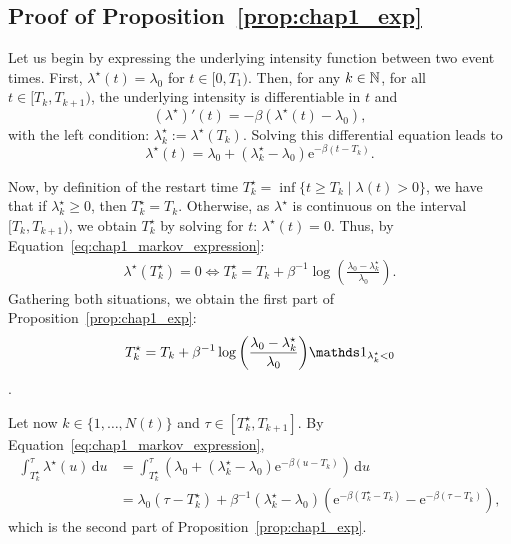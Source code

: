 \begin{subappendices}
\section{Proof of Proposition~\ref{prop:chap1_exp}}
\label{app:chap1_appendix}

Let us begin by expressing the underlying intensity function between two event times.
First, \(\lambda^\star(t) = \lambda_0\) for \(t\in[0,T_1)\).
Then, for any $k\in{\mathbb N}$, for all $t \in [T_k,T_{k+1})$, the underlying intensity is differentiable in \(t\) and
\begin{equation*}
    (\lambda^\star)'(t) = -\beta(\lambda^\star(t) - \lambda_0),
\end{equation*}
with the left condition: $\lambda_k^\star := \lambda^\star(T_k)$.
Solving this differential equation leads to
\begin{equation}\label{eq:chap1_markov_expression}
    \lambda^\star(t) = \lambda_0 + (\lambda_k^\star - \lambda_0)\mathrm{e}^{-\beta(t - T_k)}.
\end{equation}

Now, by definition of the restart time $T_k^\star = \inf{\{t\geq T_k\mid \lambda(t) > 0\}}$, we have that if $\lambda_k^\star \geq 0$, then $T_k^\star = T_k$. Otherwise, as $\lambda^\star$ is continuous on the interval $[T_k,T_{k+1})$, we obtain $T_k^\star$ by solving for $t$: \(\lambda^\star(t) = 0\).
Thus, by Equation~\eqref{eq:chap1_markov_expression}:
\begin{align*}
    \lambda^\star(T_k^\star) = 0
    \iff T_k^\star = T_k + \beta^{-1}\log{\left(\frac{\lambda_0 - \lambda^\star_k}{\lambda_0}\right)}.
\end{align*}
Gathering both situations, we obtain the first part of Proposition~\ref{prop:chap1_exp}: \[T_k^\star = T_k + \beta^{-1}\log{\left(\frac{\lambda_0 - \lambda^\star_k}{\lambda_0}\right)} \II_{\lambda_k^\star < 0}\].

Let now $k\in\{1,\ldots,N(t)\}$ and $\tau\in[T_{k}^\star,T_{k+1}]$.
By Equation~\eqref{eq:chap1_markov_expression},
\begin{align*}
    \int_{T_{k}^\star}^{\tau}{\lambda^\star(u)\,\mathrm{d}u}
    &= \int_{T_{k}^\star}^{\tau} \left( \lambda_0 + (\lambda_{k}^\star - \lambda_0)\mathrm{e}^{-\beta(u - T_{k})} \right)\,\mathrm{d}u\\
    &= \lambda_0(\tau - T_{k}^\star) + \beta^{-1}(\lambda_{k}^\star - \lambda_0)(\mathrm{e}^{-\beta(T_{k}^\star-T_{k})}-\mathrm{e}^{-\beta(\tau-T_{k})}),
\end{align*}
which is the second part of Proposition~\ref{prop:chap1_exp}.


\end{subappendices}
